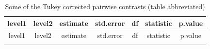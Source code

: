 \documentclass[]{article}
\theoremstyle{definition}
\theoremstyle{definition}
\theoremstyle{definition}
\theoremstyle{remark}
\begin{document}
\begin{longtable}[]{@{}ccccccc@{}}
\caption{Some of the Tukey corrected pairwise contrasts (table
abbreviated)}\tabularnewline
\toprule
\begin{minipage}[b]{0.16\columnwidth}\centering\strut
level1\strut
\end{minipage} & \begin{minipage}[b]{0.16\columnwidth}\centering\strut
level2\strut
\end{minipage} & \begin{minipage}[b]{0.10\columnwidth}\centering\strut
estimate\strut
\end{minipage} & \begin{minipage}[b]{0.11\columnwidth}\centering\strut
std.error\strut
\end{minipage} & \begin{minipage}[b]{0.05\columnwidth}\centering\strut
df\strut
\end{minipage} & \begin{minipage}[b]{0.11\columnwidth}\centering\strut
statistic\strut
\end{minipage} & \begin{minipage}[b]{0.11\columnwidth}\centering\strut
p.value\strut
\end{minipage}\tabularnewline
\midrule
\endfirsthead
\toprule
\begin{minipage}[b]{0.16\columnwidth}\centering\strut
level1\strut
\end{minipage} & \begin{minipage}[b]{0.16\columnwidth}\centering\strut
level2\strut
\end{minipage} & \begin{minipage}[b]{0.10\columnwidth}\centering\strut
estimate\strut
\end{minipage} & \begin{minipage}[b]{0.11\columnwidth}\centering\strut
std.error\strut
\end{minipage} & \begin{minipage}[b]{0.05\columnwidth}\centering\strut
df\strut
\end{minipage} & \begin{minipage}[b]{0.11\columnwidth}\centering\strut
statistic\strut
\end{minipage} & \begin{minipage}[b]{0.11\columnwidth}\centering\strut
p.value\strut
\end{minipage}\tabularnewline
\midrule
\endhead
\begin{minipage}[t]{0.16\columnwidth}\centering\strut

\end{minipage}
\end{longtable}
\end{document}

